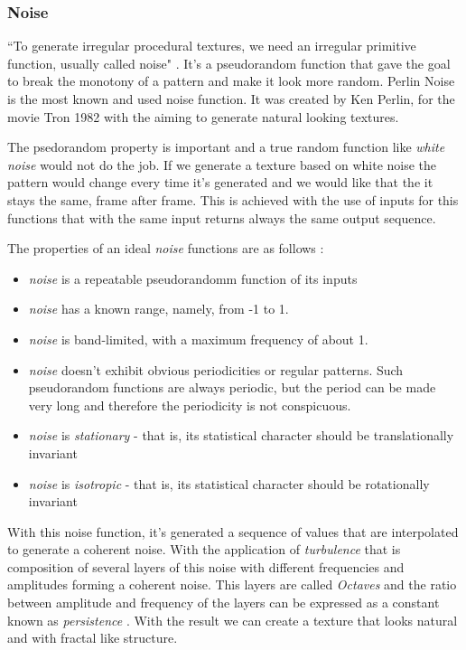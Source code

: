 
\subsubsection{Noise} %
\label{ssub:noise}


``To generate irregular procedural textures, we need an irregular primitive function, usually called noise" \cite{Ebert2002}. It's a pseudorandom function that gave the goal to break the monotony of a pattern and make it look more random.
Perlin Noise is the most known and used noise function. It was created by Ken Perlin, for the movie Tron 1982 with the aiming to generate natural looking textures.

The psedorandom property is important and a true random function like \emph{white noise} would not do the job. If we generate a texture based on white noise the pattern would change every time it's generated and we would like that the it stays the same, frame after frame. This is achieved with the use of inputs for this functions that with the same input returns always the same output sequence. 

The properties of an ideal \emph{noise} functions are as follows \cite{Ebert2002}:
\begin{itemize}
	\item \emph{noise} is a repeatable pseudorandomm function of its inputs
	\item \emph{noise} has a known range, namely, from -1 to 1.
	\item \emph{noise} is band-limited, with a maximum frequency of about 1.
	\item \emph{noise} doesn't exhibit obvious periodicities or regular patterns. Such pseudorandom functions are always periodic, but the period can be made very long and therefore the periodicity is not conspicuous.
	\item \emph{noise} is \emph{stationary} - that is, its statistical character should be translationally invariant
	\item \emph{noise} is \emph{isotropic} - that is, its statistical character should be rotationally invariant
\end{itemize}

With this noise function, it's generated a sequence of values that are interpolated to generate a coherent noise. With the application of \emph{turbulence} that is composition of several layers of this noise with different frequencies and amplitudes forming a coherent noise. This layers are called \emph{Octaves} and the ratio between amplitude and frequency of the layers can be expressed as a constant known as \emph{persistence} \cite{Kelly2008}. With the result we can create a texture that looks natural and with fractal like structure.

